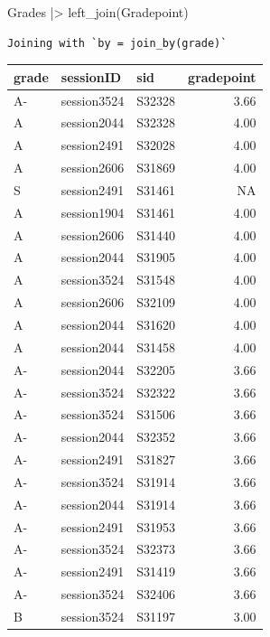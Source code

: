 \documentclass[
  letterpaper,
  DIV=11,
  numbers=noendperiod,
  oneside]{scrartcl}
\newenvironment{Shaded}{\begin{snugshade}}{\end{snugshade}}
\newcommand{\FunctionTok}[1]{\textcolor[rgb]{0.28,0.35,0.67}{#1}}
\newcommand{\NormalTok}[1]{\textcolor[rgb]{0.00,0.23,0.31}{#1}}
\newcommand{\SpecialCharTok}[1]{\textcolor[rgb]{0.37,0.37,0.37}{#1}}
\begin{document}
\begin{Shaded}
\begin{Highlighting}[]
\NormalTok{Grades }\SpecialCharTok{|\textgreater{}} \FunctionTok{left\_join}\NormalTok{(Gradepoint) }
\end{Highlighting}
\end{Shaded}

\begin{verbatim}
Joining with `by = join_by(grade)`
\end{verbatim}

\begin{tabular}{l|l|l|r}
\hline
grade & sessionID & sid & gradepoint\\
\hline
A- & session3524 & S32328 & 3.66\\
\hline
A & session2044 & S32328 & 4.00\\
\hline
A & session2491 & S32028 & 4.00\\
\hline
A & session2606 & S31869 & 4.00\\
\hline
S & session2491 & S31461 & NA\\
\hline
A & session1904 & S31461 & 4.00\\
\hline
A & session2606 & S31440 & 4.00\\
\hline
A & session2044 & S31905 & 4.00\\
\hline
A & session3524 & S31548 & 4.00\\
\hline
A & session2606 & S32109 & 4.00\\
\hline
A & session2044 & S31620 & 4.00\\
\hline
A & session2044 & S31458 & 4.00\\
\hline
A- & session2044 & S32205 & 3.66\\
\hline
A- & session3524 & S32322 & 3.66\\
\hline
A- & session3524 & S31506 & 3.66\\
\hline
A- & session2044 & S32352 & 3.66\\
\hline
A- & session2491 & S31827 & 3.66\\
\hline
A- & session3524 & S31914 & 3.66\\
\hline
A- & session2044 & S31914 & 3.66\\
\hline
A- & session2491 & S31953 & 3.66\\
\hline
A- & session3524 & S32373 & 3.66\\
\hline
A- & session2491 & S31419 & 3.66\\
\hline
A- & session3524 & S32406 & 3.66\\
\hline
B & session3524 & S31197 & 3.00\\

\end{tabular}
\end{document}
